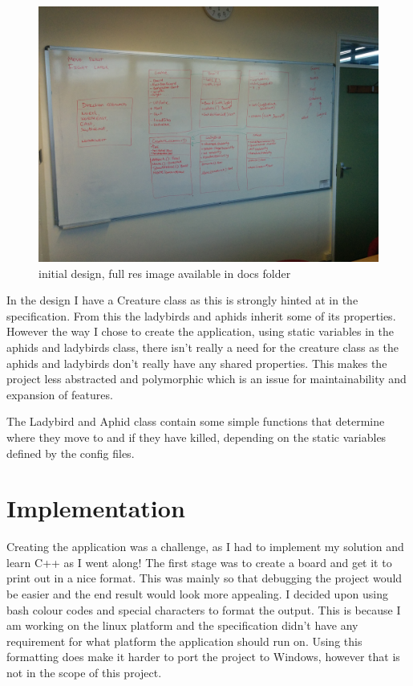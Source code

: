\documentclass[10pt]{article}
\begin{document}
  \begin{figure}[ht!]
  \centering
  \includegraphics[scale=0.10]{design.jpg}
  \caption{initial design, full res image available in docs folder \label{overflow}}
  \end{figure}

  In the design I have a Creature class as this is strongly hinted at in the specification. From this the ladybirds and aphids inherit some of its properties. However the way I chose to create the application, using static variables in the aphids and ladybirds class, there isn't really a need for the creature class as the aphids and ladybirds don't really have any shared properties. This makes the project less abstracted and polymorphic which is an issue for maintainability and expansion of features. 

  The Ladybird and Aphid class contain some simple functions that determine where they move to and if they have killed, depending on the static variables defined by the config files.

  \section{Implementation}
  Creating the application was a challenge, as I had to implement my solution and learn C++ as I went along! The first stage was to create a board and get it to print out in a nice format. This was mainly so that debugging the project would be easier and the end result would look more appealing. I decided upon using bash colour codes and special characters to format the output. This is because I am working on the linux platform and the specification didn't have any requirement for what platform the application should run on. Using this formatting does make it harder to port the project to Windows, however that is not in the scope of this project.
\end{document}
